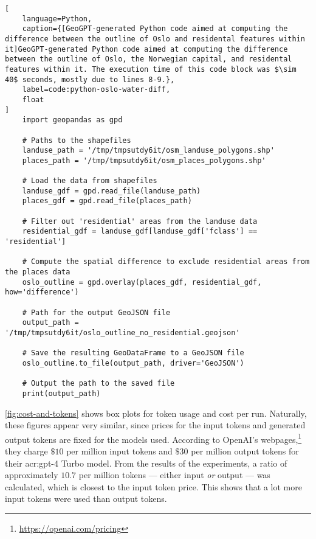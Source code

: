 \begin{lstlisting}[
    language=Python,
    caption={[GeoGPT-generated Python code aimed at computing the difference between the outline of Oslo and residental features within it]GeoGPT-generated Python code aimed at computing the difference between the outline of Oslo, the Norwegian capital, and residental features within it. The execution time of this code block was $\sim 40$ seconds, mostly due to lines 8-9.},
    label=code:python-oslo-water-diff,
    float
]
    import geopandas as gpd

    # Paths to the shapefiles
    landuse_path = '/tmp/tmpsutdy6it/osm_landuse_polygons.shp'
    places_path = '/tmp/tmpsutdy6it/osm_places_polygons.shp'
    
    # Load the data from shapefiles
    landuse_gdf = gpd.read_file(landuse_path)
    places_gdf = gpd.read_file(places_path)
    
    # Filter out 'residential' areas from the landuse data
    residential_gdf = landuse_gdf[landuse_gdf['fclass'] == 'residential']
     
    # Compute the spatial difference to exclude residential areas from the places data
    oslo_outline = gpd.overlay(places_gdf, residential_gdf, how='difference')
    
    # Path for the output GeoJSON file
    output_path = '/tmp/tmpsutdy6it/oslo_outline_no_residential.geojson'
    
    # Save the resulting GeoDataFrame to a GeoJSON file
    oslo_outline.to_file(output_path, driver='GeoJSON')
    
    # Output the path to the saved file
    print(output_path)    
\end{lstlisting}

\autoref{fig:cost-and-tokens} shows box plots for token usage and cost per run. Naturally, these figures appear very similar, since prices for the input tokens and generated output tokens are fixed for the models used. According to OpenAI's webpages,\footnote{\url{https://openai.com/pricing}} they charge $\$10$ per million input tokens and $\$30$ per million output tokens for their \acrshort{acr:gpt}-4 Turbo model. From the results of the experiments, a ratio of approximately $10.7$ per million tokens --- either input \textit{or} output --- was calculated, which is closest to the input token price. This shows that a lot more input tokens were used than output tokens.

